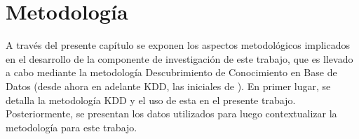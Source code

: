 
\chapter{Metodología}
\label{chp:metodologia}
A través del presente capítulo se exponen los aspectos metodológicos implicados en el desarrollo de la componente de investigación de este trabajo, que es llevado a cabo mediante la metodología Descubrimiento de Conocimiento en Base de Datos (desde ahora en adelante KDD, las iniciales de ). En primer lugar, se detalla la metodología KDD y el uso de esta en el presente trabajo. Posteriormente, se presentan los datos utilizados para luego contextualizar la metodología para este trabajo. 







%